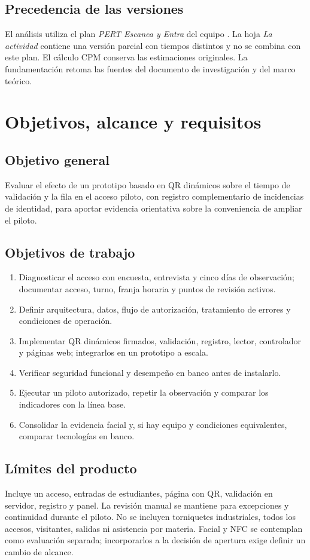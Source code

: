 \documentclass[11pt,letterpaper]{article}
\newcommand{\pagina}[1]{\clearpage\section{#1}}
\begin{document}
\subsection{Precedencia de las versiones}
El análisis utiliza el plan \textit{PERT Escanea y Entra} del equipo \parencite{pertEquipo}. La hoja \textit{La actividad} contiene una versión parcial con tiempos distintos y no se combina con este plan. El cálculo CPM conserva las estimaciones originales. La fundamentación retoma las fuentes del documento de investigación y del marco teórico.

\pagina{Objetivos, alcance y requisitos}
\subsection{Objetivo general}
Evaluar el efecto de un prototipo basado en QR dinámicos sobre el tiempo de validación y la fila en el acceso piloto, con registro complementario de incidencias de identidad, para aportar evidencia orientativa sobre la conveniencia de ampliar el piloto.

\subsection{Objetivos de trabajo}
\begin{enumerate}
\item Diagnosticar el acceso con encuesta, entrevista y cinco días de observación; documentar acceso, turno, franja horaria y puntos de revisión activos.
\item Definir arquitectura, datos, flujo de autorización, tratamiento de errores y condiciones de operación.
\item Implementar QR dinámicos firmados, validación, registro, lector, controlador y páginas web; integrarlos en un prototipo a escala.
\item Verificar seguridad funcional y desempeño en banco antes de instalarlo.
\item Ejecutar un piloto autorizado, repetir la observación y comparar los indicadores con la línea base.
\item Consolidar la evidencia facial y, si hay equipo y condiciones equivalentes, comparar tecnologías en banco.
\end{enumerate}

\subsection{Límites del producto}
Incluye un acceso, entradas de estudiantes, página con QR, validación en servidor, registro y panel. La revisión manual se mantiene para excepciones y continuidad durante el piloto. No se incluyen torniquetes industriales, todos los accesos, visitantes, salidas ni asistencia por materia. Facial y NFC se contemplan como evaluación separada; incorporarlos a la decisión de apertura exige definir un cambio de alcance.
\end{document}
